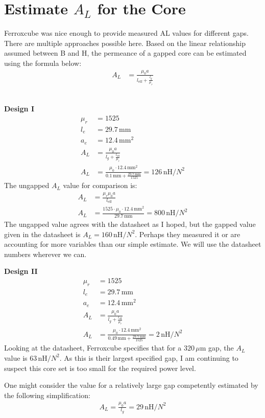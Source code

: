 \documentclass{article}
\begin{document}
\section{Estimate \(A_L\) for the Core}
Ferroxcube was nice enough to provide measured AL values for different gaps.  There are multiple approaches possible here.  Based on the linear relationship assumed between B and H, the permeance of a gapped core can be estimated using the formula below:
\begin{align}
A_L &= \frac{\mu_0 a}{l_\text{eff} + \frac{l_g}{\mu_r}}
\end{align} \\

\begin{minipage}[t]{0.45\linewidth}
    \textbf{Design I}
    \begin{align*}
        \mu_r &= 1525 \\
        l_e &= 29.7 \, \text{mm} \\
        a_e &= 12.4 \, \text{mm}^2 \\
        A_L &= \frac{\mu_0 a}{l_g + \frac{l_\text{eff}}{\mu_r}} \\
        A_L &= \frac{\mu_0 \cdot 12.4 \, \text{mm}^2}{0.1 \, \text{mm} + \frac{29.7 \, \text{mm}}{1525}} = 126 \, \text{nH}/N^2
    \end{align*}
    The ungapped \(A_L\) value for comparison is:
    \begin{align*}
    A_L &= \frac{\mu_r\mu_0 a}{l_\text{eff}} \\
    A_L &= \frac{1525 \cdot \mu_0 \cdot 12.4 \, \text{mm}^2}{29.7 \, \text{mm}} = 800 \, \text{nH}/N^2
    \end{align*}
    The ungapped value agrees with the datasheet as I hoped, but the gapped value given in the datasheet is \(A_L = 160 \, \text{nH}/N^2\). Perhaps they measured it or are accounting for more variables than our simple estimate. We will use the datasheet numbers wherever we can.
\end{minipage}
\begin{minipage}[t]{0.45\linewidth}
    \textbf{Design II}
    \begin{align*}
    \mu_r &= 1525 \\
    l_e &= 29.7 \, \text{mm} \\
    a_e &= 12.4 \, \text{mm}^2 \\
    A_L &= \frac{\mu_0 a}{l_g + \frac{l_\text{eff}}{\mu_r}} \\
    A_L &= \frac{\mu_0 \cdot 12.4 \, \text{mm}^2}{0.49 \, \text{mm} + \frac{29.7 \, \text{mm}}{1525}} = 2 \, \text{nH}/N^2
    \end{align*}
    Looking at the datasheet, Ferroxcube specifies that for a \(320 \, \mu\text{m}\) gap, the \(A_L\) value is \(63 \, \text{nH}/N^2\). As this is their largest specified gap, I am continuing to suspect this core set is too small for the required power level. 
    
    One might consider the value for a relatively large gap competently estimated by the following simplification:
    \begin{align*}
    A_L = \frac{\mu_0 a}{l_g} = 29 \, \text{nH}/N^2
    \end{align*}
\end{minipage}
\end{document}
